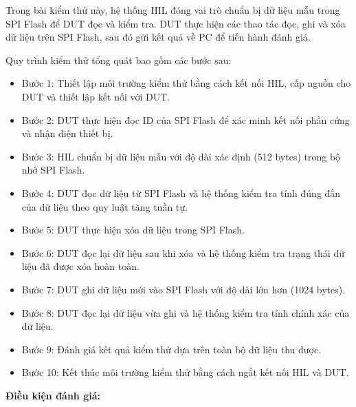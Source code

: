 Trong bài kiểm thử này, hệ thống HIL đóng vai trò chuẩn bị dữ liệu mẫu trong SPI Flash để DUT đọc và kiểm tra. DUT thực hiện các thao tác đọc, ghi và xóa dữ liệu trên SPI Flash, sau đó gửi kết quả về PC để tiến hành đánh giá.

Quy trình kiểm thử tổng quát bao gồm các bước sau:

\begin{itemize}
    \item Bước 1: Thiết lập môi trường kiểm thử bằng cách kết nối HIL, cấp nguồn cho DUT và thiết lập kết nối với DUT.
    \item Bước 2: DUT thực hiện đọc ID của SPI Flash để xác minh kết nối phần cứng và nhận diện thiết bị.
    \item Bước 3: HIL chuẩn bị dữ liệu mẫu với độ dài xác định (512 bytes) trong bộ nhớ SPI Flash.
    \item Bước 4: DUT đọc dữ liệu từ SPI Flash và hệ thống kiểm tra tính đúng đắn của dữ liệu theo quy luật tăng tuần tự.
    \item Bước 5: DUT thực hiện xóa dữ liệu trong SPI Flash.
    \item Bước 6: DUT đọc lại dữ liệu sau khi xóa và hệ thống kiểm tra trạng thái dữ liệu đã được xóa hoàn toàn.
    \item Bước 7: DUT ghi dữ liệu mới vào SPI Flash với độ dài lớn hơn (1024 bytes).
    \item Bước 8: DUT đọc lại dữ liệu vừa ghi và hệ thống kiểm tra tính chính xác của dữ liệu.
    \item Bước 9: Đánh giá kết quả kiểm thử dựa trên toàn bộ dữ liệu thu được.
    \item Bước 10: Kết thúc môi trường kiểm thử bằng cách ngắt kết nối HIL và DUT.
\end{itemize}

\textbf{Điều kiện đánh giá:}

